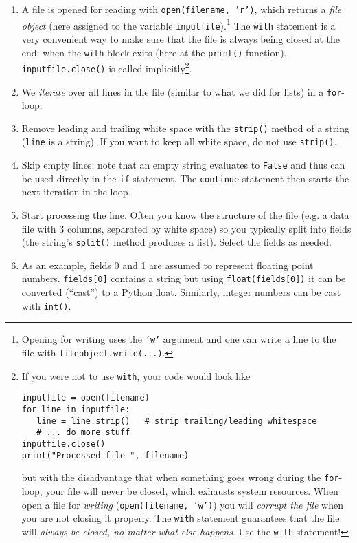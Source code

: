\documentclass[letterpaper]{scrartcl}
\begin{document}
\begin{enumerate}
\item A file is opened for reading with \texttt{open(filename, 'r')},
  which returns a \emph{file object} (here assigned to the variable
  \texttt{inputfile}).\footnote{Opening for writing uses the
    \texttt{'w'} argument and one can write a line to the file with
    \texttt{fileobject.write(...)}.} The
  \texttt{with} statement is a very convenient way to make
  sure that the file is always being closed at the end: when the
  \texttt{with}-block exits (here at the
  \texttt{print()} function),
  \texttt{inputfile.close()} is called
  implicitly\cprotect\footnote{If you were not to use \texttt{with},
    your code would look like
\begin{verbatim}
inputfile = open(filename)
for line in inputfile:
   line = line.strip()   # strip trailing/leading whitespace
   # ... do more stuff
inputfile.close()
print("Processed file ", filename)
\end{verbatim}
    but with the disadvantage that when something goes wrong during
    the \texttt{for}-loop, your file will never be closed, which
    exhausts system resources. When open a file for \emph{writing}
    (\texttt{open(filename, 'w')}) you will \emph{corrupt the file}
    when you are not closing it properly. The \texttt{with} statement
    guarantees that the file will \emph{always be closed, no matter
      what else happens}. Use the \texttt{with} statement!}.
\item We \emph{iterate} over all lines in the file (similar to what we
  did for lists) in a \texttt{for}-loop.
\item Remove leading and trailing white space with the
  \texttt{strip()} method of a string (\texttt{line} is a string). If
  you want to keep all white space, do not use \texttt{strip()}.
\item Skip empty lines: note that an empty string evaluates to
  \texttt{False} and thus can be used directly in the \texttt{if}
  statement. The \texttt{continue} statement then starts the next
  iteration in the loop.
\item Start processing the line. Often you know the structure of the
  file (e.g. a data file with 3 columns, separated by white space) so
  you typically split into fields (the string's \texttt{split()}
  method produces a list). Select the fields as needed.
\item As an example, fields 0 and 1 are assumed to represent floating
  point numbers. \texttt{fields[0]} contains a string but using
  \texttt{float(fields[0])} it can be converted (``cast'') to a Python
  float. Similarly, integer numbers can be cast with \texttt{int()}.
\end{enumerate}
\end{document}
